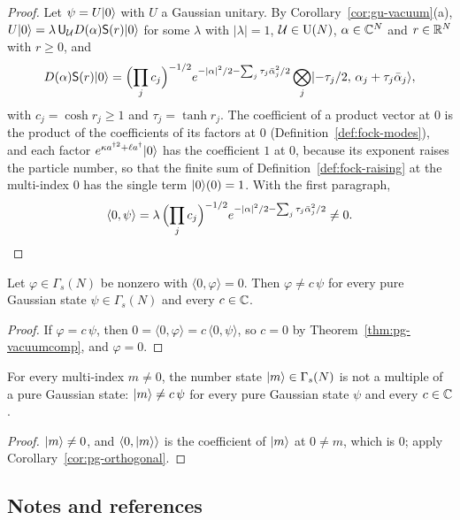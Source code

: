 \begin{veteenv}
\begin{vetyenv}
\begin{proof}
Let $\psi=U\lvert 0\rangle$ with $U$ a Gaussian unitary. By Corollary~\ref{cor:gu-vacuum}(a), $U\lvert 0\rangle=\lambda\,\mathsf U_\mathcal U D(\alpha)\mathsf S(r)\lvert 0\rangle$ for
some $\lambda$ with $\lvert\lambda\rvert=1$, $\mathcal U\in\mathrm{U}(N)$, $\alpha\in\mathbb C^N$ and $r\in\mathbb R^N$ with $r\ge0$, and
\[
 D(\alpha)\mathsf S(r)\lvert 0\rangle=\Bigl(\prod_jc_j\Bigr)^{-1/2}e^{-\lvert\alpha\rvert^2/2-\sum_j\tau_j\bar\alpha_j^2/2}\bigotimes_j\lvert -\tau_j/2,\,\alpha_j+\tau_j\bar\alpha_j\rangle,
\]
with $c_j=\cosh r_j\ge1$ and $\tau_j=\tanh r_j$. The coefficient of a product vector at $0$ is the product of the coefficients of its
factors at $0$ (Definition~\ref{def:fock-modes}), and each factor $e^{\kappa a^{\dagger2}+\ell a^\dagger}\lvert 0\rangle$ has the coefficient $1$
at $0$, because its exponent raises the particle number, so that the finite sum of Definition~\ref{def:fock-raising} at the
multi-index $0$ has the single term $\lvert 0\rangle(0)=1$. With the first paragraph,
\[
 \langle0,\psi\rangle=\lambda\,\Bigl(\prod_jc_j\Bigr)^{-1/2}e^{-\lvert\alpha\rvert^2/2-\sum_j\tau_j\bar\alpha_j^2/2}\ne0 .\qedhere
\]
\end{proof}

\begin{corollary}\label{cor:pg-orthogonal}
Let $\varphi\in\Gamma_s(N)$ be nonzero with $\langle0,\varphi\rangle=0$. Then $\varphi\ne c\,\psi$ for every pure Gaussian state
$\psi\in\Gamma_s(N)$ and every $c\in\mathbb C$.
\end{corollary}

\begin{proof}
If $\varphi=c\,\psi$, then $0=\langle0,\varphi\rangle=c\,\langle0,\psi\rangle$, so $c=0$ by Theorem~\ref{thm:pg-vacuumcomp}, and
$\varphi=0$.
\end{proof}

\begin{corollary}\label{cor:pg-number}
For every multi-index $m\ne0$, the number state $\lvert m\rangle\in\Gamma_s(N)$ is not a multiple of a pure Gaussian state: $\lvert m\rangle\ne
c\,\psi$ for every pure Gaussian state $\psi$ and every $c\in\mathbb C$.
\end{corollary}

\begin{proof}
$\lvert m\rangle\ne0$, and $\langle0,\lvert m\rangle\rangle$ is the coefficient of $\lvert m\rangle$ at $0\ne m$, which is $0$; apply
Corollary~\ref{cor:pg-orthogonal}.
\end{proof}
\end{vetyenv}

\subsection*{Notes and references}


\end{veteenv}
